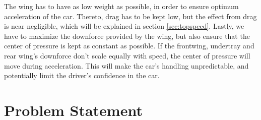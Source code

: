   The wing has to have as low weight as possible, in order to ensure optimum acceleration of the car. Thereto, drag has to be kept low, but the effect from drag is near negligible, which will be explained in section \ref{sec:topspeed}. Lastly, we have to maximize the downforce provided by the wing, but also ensure that the center of pressure is kept as constant as possible. If the frontwing, undertray and rear wing's downforce don't scale equally with speed, the center of pressure will move during acceleration. This will make the car's handling unpredictable, and potentially limit the driver's confidence in the car.

\section{Problem Statement}
